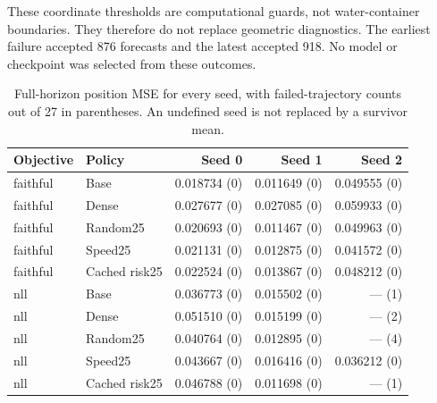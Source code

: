 These coordinate thresholds are computational guards, not water-container
boundaries. They therefore do not replace geometric diagnostics. The earliest
failure accepted 876 forecasts and the latest accepted 918. No model or
checkpoint was selected from these outcomes.


\begin{table}[t]
\centering\small
\caption{Full-horizon position MSE for every seed, with failed-trajectory counts out of 27 in parentheses. An undefined seed is not replaced by a survivor mean.}
\label{tab:full-seeds}
\begin{tabular}{llrrr}
\toprule
Objective & Policy & Seed 0 & Seed 1 & Seed 2\\
\midrule
faithful & Base & 0.018734 (0) & 0.011649 (0) & 0.049555 (0)\\
faithful & Dense & 0.027677 (0) & 0.027085 (0) & 0.059933 (0)\\
faithful & Random25 & 0.020693 (0) & 0.011467 (0) & 0.049963 (0)\\
faithful & Speed25 & 0.021131 (0) & 0.012875 (0) & 0.041572 (0)\\
faithful & Cached risk25 & 0.022524 (0) & 0.013867 (0) & 0.048212 (0)\\
nll & Base & 0.036773 (0) & 0.015502 (0) & --- (1)\\
nll & Dense & 0.051510 (0) & 0.015199 (0) & --- (2)\\
nll & Random25 & 0.040764 (0) & 0.012895 (0) & --- (4)\\
nll & Speed25 & 0.043667 (0) & 0.016416 (0) & 0.036212 (0)\\
nll & Cached risk25 & 0.046788 (0) & 0.011698 (0) & --- (1)\\
\bottomrule
\end{tabular}
\end{table}


